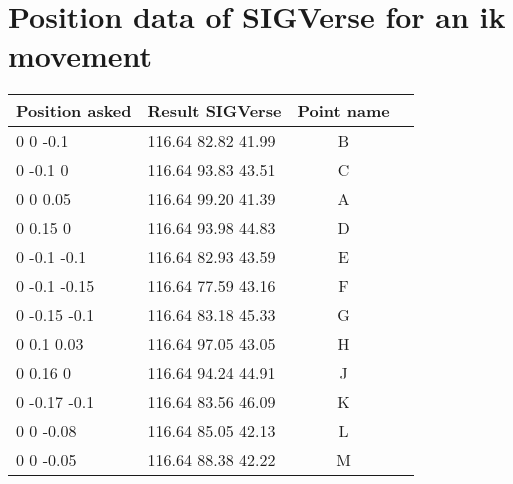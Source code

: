 



\section{Position data of SIGVerse for an ik movement}\label{annex:dataPos}
\noindent\begin{minipage}{\linewidth}%
\begin{center}
\begin{tabular}{| l | m{8cm} | c | c |}
\hline
	Position asked & Result SIGVerse & Point name\\\hline
	0 0 -0.1 & 116.64 82.82 41.99 & B \\
	0 -0.1 0 & 116.64 93.83 43.51 & C\\
	0 0 0.05 & 116.64 99.20 41.39 & A\\
	0 0.15 0 & 116.64 93.98 44.83 & D\\
	0 -0.1 -0.1 & 116.64 82.93 43.59 & E\\
	0 -0.1 -0.15 & 116.64 77.59 43.16 & F\\
	0 -0.15 -0.1 & 116.64 83.18 45.33 & G\\
	0 0.1 0.03	& 116.64 97.05 43.05 & H\\
	0 0.16 0 & 116.64 94.24 44.91 & J\\
	0 -0.17 -0.1 & 116.64 83.56 46.09 & K\\
	0 0 -0.08 & 116.64 85.05 42.13 & L\\
	0 0 -0.05 & 116.64 88.38 42.22 & M\\\hline
\end{tabular}
\end{center}
\label{tab:lots}%
\end{minipage}